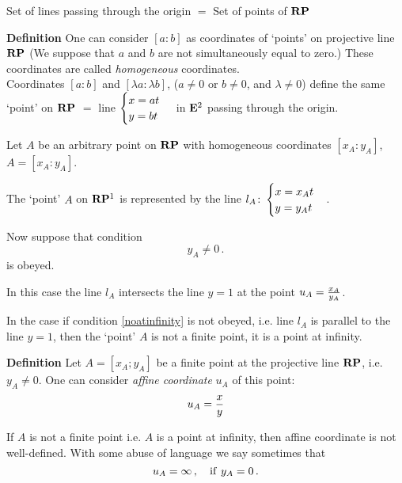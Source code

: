 \documentclass[12pt]{article}
\numberwithin{equation}{section}
\begin{document}
\centerline{
Set of lines passing through the origin $=$ Set of points of ${\bf R}{\bf P}$}


\smallskip


{\bf Definition}
One can consider  $[a:b]$ as
 coordinates of `points' on projective line ${\bf R}{\bf P}$  
(We suppose that $a$ and $b$ are not simultaneously equal to zero.)
These coordinates are called {\it homogeneous} coordinates.\\
Coordinates  $[a:b]$ and $[\lambda a:\lambda b]$,
($a\not=0$ or $b\not=0$, and $\lambda\not=0$) define the same `point'
on ${\bf R}{\bf P}$ $=$ line
      $\begin{cases} x=at\cr y=bt\cr\end{cases}$ in ${\bf E}^2$
passing through the origin.

\smallskip

  Let $A$ be an arbitrary point on ${\bf R}{\bf P}$
with homogeneous coordinates $[x_A:y_A]$,  $A=[x_A:y_A]$.

The `point' $A$ on ${\bf R}{\bf P}^1$ is represented by the line
$l_A\colon 
\begin{cases} x=x_At\cr y=y_At\cr\end{cases}$.

Now suppose that condition
     \begin{equation}\label{noatinfinity}
           y_A\not=0\,.
     \end{equation}
is obeyed.

In this case the line $l_A$ intersects
the line $y=1$ at the point $u_A={x_A\over y_A}$.
  
 In the case if condition \eqref{noatinfinity}
is not obeyed, i.e. line $l_A$ is parallel to the line $y=1$, then
the `point' $A$ is not a finite point, it is a point
at infinity.

\smallskip

   {\bf Definition}  Let $A=[x_A;y_A]$ be a finite point
at the projective line ${\bf R}{\bf P}$, i.e. $y_A\not=0$.
 One can consider
{\it affine coordinate} $u_A$ of this point:
     \begin{equation}\label{affinecoordinate}
         u_A={x\over y}
             \end{equation}

If $A$ is not  a finite  point i.e. $A$ is a point
at infinity, then  affine coordinate is not well-defined.
With some abuse of language we say sometimes
that  \begin{equation}\label{affinecoordinate1}
         u_A=\infty\,,\quad {\rm if}\,\, y_A=0\,.
             \end{equation}
\end{document}
